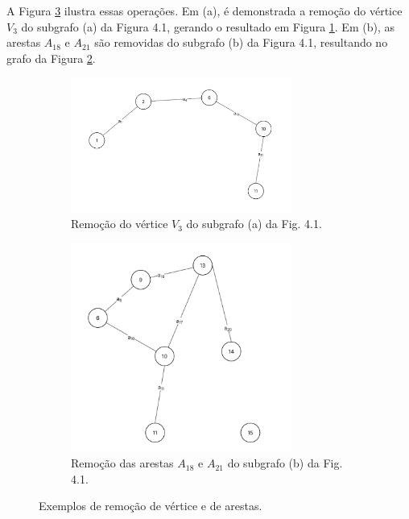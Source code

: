 A Figura \ref{fig:duasRemocoes} ilustra essas operações. Em (a), é demonstrada a remoção do vértice $V_3$ do subgrafo (a) da Figura 4.1, gerando o resultado em Figura \ref{fig:remocaoVertice}. Em (b), as arestas $A_{18}$ e $A_{21}$ são removidas do subgrafo (b) da Figura 4.1, resultando no grafo da Figura \ref{fig:remocaoAresta}.

\begin{figure}[!h]
    \centering
    \begin{subfigure}[b]{0.48\textwidth}
        \centering
        \includegraphics[width=0.8\textwidth]{figuras/subgrafos/subgrafo_remocao_vertice.png}
        \caption{Remoção do vértice $V_3$ do subgrafo (a) da Fig. 4.1.}
        \label{fig:remocaoVertice}
    \end{subfigure}
    \hfill
    \begin{subfigure}[b]{0.48\textwidth}
        \centering
        \includegraphics[width=0.8\textwidth]{figuras/subgrafos/subgrafo_remocao_aresta.png}
        \caption{Remoção das arestas $A_{18}$ e $A_{21}$ do subgrafo (b) da Fig. 4.1.}
        \label{fig:remocaoAresta}
    \end{subfigure}
    \caption{Exemplos de remoção de vértice e de arestas.}
    \label{fig:duasRemocoes}
\end{figure}

